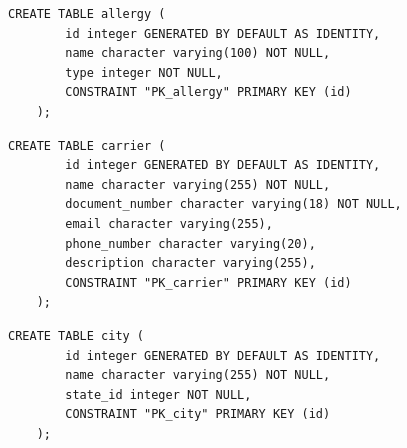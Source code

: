 \begin{quadro}[H]
	\caption[Script SQL --- Tabela \texttt{allergy}]{Script SQL --- Tabela \texttt{allergy}}
	\label{quadro:script-allergy}
	
	\begin{minipage}{0.96\textwidth}
		\begin{lstlisting}[style=academic-sql]
	CREATE TABLE allergy (
		id integer GENERATED BY DEFAULT AS IDENTITY,
		name character varying(100) NOT NULL,
		type integer NOT NULL,
		CONSTRAINT "PK_allergy" PRIMARY KEY (id)
	);
		\end{lstlisting}
	\end{minipage}
	
\end{quadro}

\begin{quadro}[H]
	\caption[Script SQL --- Tabela \texttt{carrier}]{Script SQL --- Tabela \texttt{carrier}}
	\label{quadro:script-carrier}
	
	\begin{minipage}{0.96\textwidth}
		\begin{lstlisting}[style=academic-sql]
	CREATE TABLE carrier (
		id integer GENERATED BY DEFAULT AS IDENTITY,
		name character varying(255) NOT NULL,
		document_number character varying(18) NOT NULL,
		email character varying(255),
		phone_number character varying(20),
		description character varying(255),
		CONSTRAINT "PK_carrier" PRIMARY KEY (id)
	);
		\end{lstlisting}
	\end{minipage}
	
\end{quadro}

\begin{quadro}[H]
	\caption[Script SQL --- Tabela \texttt{city}]{Script SQL --- Tabela \texttt{city}}
	\label{quadro:script-city}
	
	\begin{minipage}{0.96\textwidth}
		\begin{lstlisting}[style=academic-sql]
	CREATE TABLE city (
		id integer GENERATED BY DEFAULT AS IDENTITY,
		name character varying(255) NOT NULL,
		state_id integer NOT NULL,
		CONSTRAINT "PK_city" PRIMARY KEY (id)
	);
		\end{lstlisting}
	\end{minipage}
	
\end{quadro}

